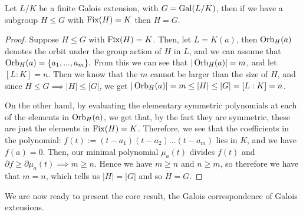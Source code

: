 

\begin{theorem}\label{thm:equal-subgroup-fixed-points}
    Let $L/K$ be a finite Galois extension, with $G=\operatorname{Gal}(L/K)$, then if we have a subgroup $H\leq G$ with $\operatorname{Fix}(H)=K$ then $H=G$.
\end{theorem}

\begin{proof}
    Suppose $H\leq G$ with $\operatorname{Fix}(H)=K$. Then, let $L = K(a)$, then $\operatorname{Orb}_H(a)$ denotes the orbit under the group action of $H$ in $L$, and we can assume that $\operatorname{Orb}_H(a) = \{a_1,...,a_m\}.$ From this we can see that $|\operatorname{Orb}_H(a)| = m$, and let $[L:K]=n$.
    Then we know that the $m$ cannot be larger than the size of $H$, and since $H\leq G \implies |H|\leq|G|$, we get $|\operatorname{Orb}_H(a)| = m \leq |H| \leq |G| = [L:K] = n$.
    
   
    On the other hand, by evaluating the elementary symmetric polynomials at each of the elements in $\operatorname{Orb}_H(a)$, we get that, by the fact they are symmetric, these are just the elements in $\operatorname{Fix}(H)=K$. Therefore, we see that the coefficients in the polynomial: $f(t) := (t-a_1)(t-a_2)...(t-a_m)$ lies in $K$, and we have $f(a)=0$. Then, our minimal polynomial $\mu_a(t)$ divides $f(t)$ and $\partial f \geq \partial \mu_a(t) \implies m \geq n$. Hence we have $m \geq n$ and $n \geq m$, so therefore we have that $m=n$, which tells us $|H|=|G|$ and so $H=G.$
\end{proof}

We are now ready to present the core result, the Galois correspondence of Galois extensions. 

